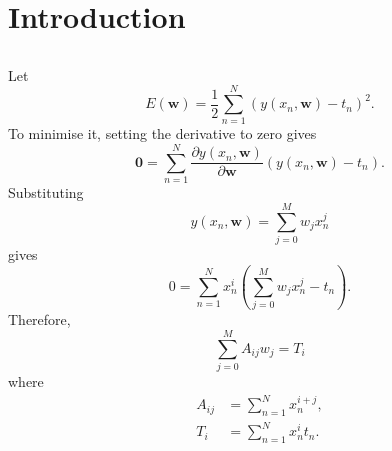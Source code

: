 \section{Introduction}


\subsection{}
Let 
%
\begin{equation}
E(\mathbf{w}) = \frac{1}{2} \sum_{n = 1}^{N} \left( y(x_n, \mathbf{w}) - t_n \right) ^ 2.
\end{equation}
%
To minimise it, setting the derivative to zero gives
%
\begin{equation}
\mathbf{0} = \sum_{n = 1}^{N} \frac{\partial y(x_n, \mathbf{w})}{\partial \mathbf{w}} \left( y(x_n, \mathbf{w}) - t_n \right).
\end{equation}
%
Substituting 
%
\begin{equation}
y(x_n, \mathbf{w}) = \sum_{j = 0}^{M} w_j x_n^j
\end{equation}
%
gives
%
\begin{equation}
0 = \sum_{n = 1}^{N} x_n^i \left( \sum_{j = 0}^{M} w_j x_n^j - t_n \right).
\end{equation}
%
Therefore,
%
\begin{equation}
\sum_{j = 0}^{M} A_{ij} w_j = T_i
\end{equation}
%
where
%
\begin{equation}
\begin{aligned}
A_{ij} &= \sum_{n = 1}^{N} x_n^{i + j}, \\
T_i &= \sum_{n = 1}^{N} x_n^i t_n.
\end{aligned}
\end{equation}



